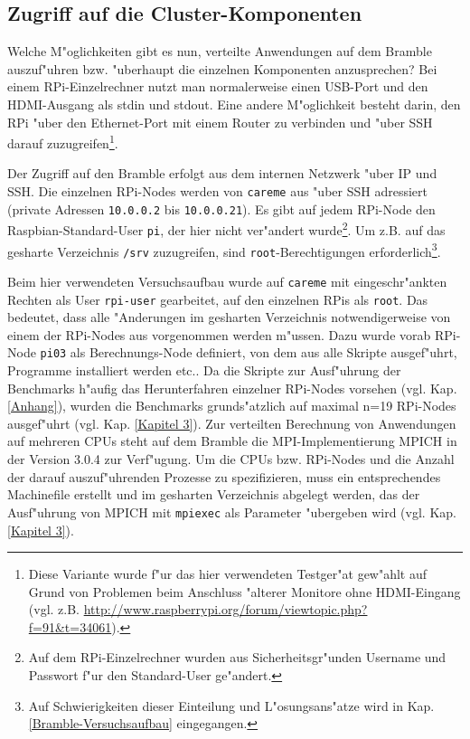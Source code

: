 \subsection{Zugriff auf die Cluster-Komponenten}\label{Zugriff}

Welche M"oglichkeiten gibt es nun, verteilte Anwendungen auf dem Bramble auszuf"uhren bzw. "uberhaupt die einzelnen Komponenten anzusprechen? Bei einem RPi-Einzelrechner nutzt man normalerweise einen USB-Port und den HDMI-Ausgang als stdin und stdout. Eine andere M"oglichkeit besteht darin, den RPi "uber den Ethernet-Port mit einem Router zu verbinden und "uber SSH darauf zuzugreifen\footnote{Diese Variante wurde f"ur das hier verwendeten Testger"at gew"ahlt auf Grund von Problemen beim Anschluss "alterer Monitore ohne HDMI-Eingang (vgl. z.B. \url{http://www.raspberrypi.org/forum/viewtopic.php?f=91&t=34061}).}. 

Der Zugriff auf den Bramble erfolgt aus dem internen Netzwerk "uber IP und SSH. Die einzelnen RPi-Nodes werden von \texttt{careme} aus "uber SSH adressiert (private Adressen \texttt{10.0.0.2} bis \texttt{10.0.0.21}). Es gibt auf jedem RPi-Node den Raspbian-Standard-User \texttt{pi}, der hier nicht ver"andert wurde\footnote{Auf dem RPi-Einzelrechner wurden aus Sicherheitsgr"unden Username und Passwort f"ur den Standard-User ge"andert.}. Um z.B. auf das gesharte Verzeichnis \texttt{/srv} zuzugreifen, sind \texttt{root}-Berechtigungen erforderlich\footnote{Auf Schwierigkeiten dieser Einteilung und L"osungsans"atze wird in Kap. \ref{Bramble-Versuchsaufbau} eingegangen.}. 

Beim hier verwendeten Versuchsaufbau wurde auf \texttt{careme} mit eingeschr"ankten Rechten als User \texttt{rpi-user} gearbeitet, auf den einzelnen RPis als \texttt{root}. Das bedeutet, dass alle "Anderungen im gesharten Verzeichnis notwendigerweise von einem der RPi-Nodes aus vorgenommen werden m"ussen. Dazu wurde vorab RPi-Node \texttt{pi03} als Berechnungs-Node definiert, von dem aus alle Skripte ausgef"uhrt, Programme installiert werden etc.. Da die Skripte zur Ausf"uhrung der Benchmarks h"aufig das Herunterfahren einzelner RPi-Nodes vorsehen (vgl. Kap. \ref{Anhang}), wurden die Benchmarks grunds"atzlich auf maximal n=19 RPi-Nodes ausgef"uhrt (vgl. Kap. \ref{Kapitel 3}). Zur verteilten Berechnung von Anwendungen auf mehreren CPUs steht auf dem Bramble die MPI-Implementierung MPICH in der Version 3.0.4 zur Verf"ugung. Um die CPUs bzw. RPi-Nodes und die Anzahl der darauf auszuf"uhrenden Prozesse zu spezifizieren, muss ein entsprechendes Machinefile erstellt und im gesharten Verzeichnis abgelegt werden, das der Ausf"uhrung von MPICH mit \texttt{mpiexec} als Parameter "ubergeben wird (vgl. Kap. \ref{Kapitel 3}). 
\endinput 